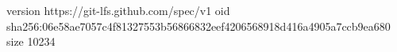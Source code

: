 version https://git-lfs.github.com/spec/v1
oid sha256:06e58ae7057c4f81327553b56866832eef4206568918d416a4905a7ccb9ea680
size 10234
